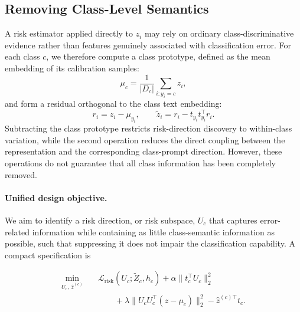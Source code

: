 \subsection{Removing Class-Level Semantics}
A risk estimator applied directly to $z_i$ may rely on ordinary
class-discriminative evidence rather than features genuinely associated
with classification error. For each class $c$, we therefore compute a
class prototype, defined as the mean embedding of its calibration samples:
\begin{equation}
 \mu_c=\frac{1}{|D_c|}\sum_{i:y_i=c}z_i,
\end{equation}
and form a residual orthogonal to the class text embedding:
\begin{equation}
 r_i=z_i-\mu_{y_i}, \qquad
 \tilde z_i=r_i-t_{y_i}t_{y_i}^{\top}r_i.
 \label{eq:residual}
\end{equation}
Subtracting the class prototype restricts risk-direction discovery to
within-class variation, while the second operation reduces the direct coupling between the representation and the corresponding class-prompt direction. However, these operations do not guarantee that all class information has been completely removed.

\paragraph{Unified design objective.}
We aim to identify a risk direction, or risk subspace, \(U_c\) that captures error-related information while containing as little class-semantic information as possible, such that suppressing it does not impair the classification capability. A compact specification is


\begin{equation}
\begin{aligned}
\min_{U_c,\,\hat z^{(c)}}\quad
&\mathcal{L}_{\mathrm{risk}}(U_c;\tilde Z_c,h_c)
+\alpha\|t_c^{\top}U_c\|_2^2\\
&\qquad+\lambda\|U_cU_c^{\top}(z-\mu_c)\|_2^2
-\hat z^{(c)\top}t_c .
\end{aligned}
\label{eq:unified_objective}
\end{equation}

